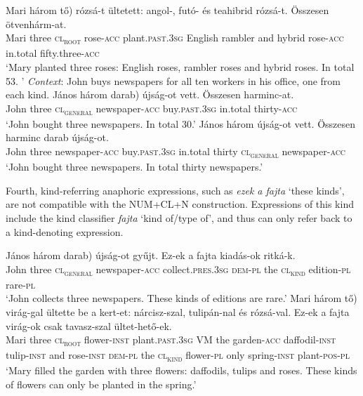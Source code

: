 \documentclass[output=paper]{langscibook}
\begin{document}
\ea \label{schv-nem:ex:16}
\gll Mari három \minsp{(*} tő) rózsá-t ültetett: angol-, futó- és teahibrid  rózsá-t. Összesen ötvenhárm-at. \\
 Mari three {} \textsc{cl\textsubscript{root}} rose-\textsc{acc} plant.\textsc{past}.\textsc{3sg} English  rambler and  hybrid  rose-\textsc{acc}  in.total    fifty.three-\textsc{acc}\\
\glt `Mary planted three roses: English roses, rambler roses and hybrid roses. In total 53. '
\ex \label{schv-nem:ex:17} \textit{Context}: John buys newspapers for all ten workers in his office, one from each kind.
\ea \label{schv-nem:ex:17b}
\gll János három \minsp{(*} darab) újság-ot vett. Összesen  harminc-at. \\
John  three {} \textsc{cl\textsubscript{general}} newspaper-\textsc{acc} buy.\textsc{past}.\textsc{3sg} in.total thirty-\textsc{acc}\\
\glt `John bought three newspapers. In total 30.'
\ex \label{schv-nem:ex:17c} 
\gll János három újság-ot vett. Összesen harminc darab újság-ot. \\
John  three  newspaper-\textsc{acc} buy.\textsc{past}.\textsc{3sg} in.total thirty \textsc{cl\textsubscript{general}} newspaper-\textsc{acc}\\
\glt `John bought three newspapers. In total thirty newspapers.'
\z
\z

\noindent Fourth, kind-referring anaphoric expressions, such as \textit{ezek a fajta} `these kinds', are not compatible with the NUM+CL+N construction. Expressions of this kind include the kind classifier \textit{fajta} `kind of/type of', and thus can only refer back to a kind-denoting expression.

\ea \label{schv-nem:ex:18}
\gll János három \minsp{(*} darab) újság-ot gyűjt. Ez-ek a fajta kiadás-ok ritká-k. \\
John three {} \textsc{cl\textsubscript{general}} newspaper-\textsc{acc} collect.\textsc{pres}.\textsc{3sg} \textsc{dem}-\textsc{pl} the \textsc{cl\textsubscript{kind}} edition-\textsc{pl} rare-\textsc{pl}\\
\glt `John collects three newspapers. These kinds of editions are rare.'
\ex \label{schv-nem:ex:19}
\gll Mari három \minsp{(*} tő) virág-gal ültette be a kert-et: nárcisz-szal, tulipán-nal és rózsá-val. Ez-ek a fajta virág-ok csak tavasz-szal ültet-hető-ek. \\
Mari three {} \textsc{cl\textsubscript{root}} flower-\textsc{inst} plant.\textsc{past}.\textsc{3sg} VM the garden-\textsc{acc} daffodil-\textsc{inst} tulip-\textsc{inst} and rose-\textsc{inst}  \textsc{dem}-\textsc{pl} the \textsc{cl\textsubscript{kind}} flower-\textsc{pl} only spring-\textsc{inst} plant-\textsc{pos}-\textsc{pl}\\
\glt ‘Mary filled the garden with three flowers: daffodils, tulips and roses. These kinds of flowers can only be planted in the spring.'
\z 
\end{document}

